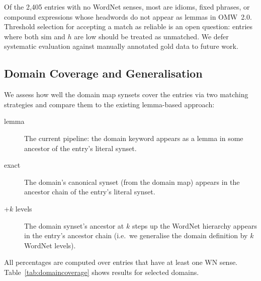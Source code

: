 \documentclass[11pt,a4paper]{article}
\begin{document}
Of the 2,405 entries with no WordNet senses, most are idioms, fixed
phrases, or compound expressions whose headwords do not appear as lemmas
in OMW~2.0.
Threshold selection for accepting a match as reliable is an open
question: entries where both $\mathrm{sim}$ and $h$ are low should be
treated as unmatched.
We defer systematic evaluation against manually annotated gold data to
future work.

\subsection{Domain Coverage and Generalisation}
\label{subsec:domaincoverage}

We assess how well the domain map synsets cover the entries via two
matching strategies and compare them to the existing lemma-based approach:

\begin{description}
  \item[lemma] The current pipeline: the domain keyword appears as a
    lemma in some ancestor of the entry's literal synset.
  \item[exact] The domain's canonical synset (from the domain map) appears
    in the ancestor chain of the entry's literal synset.
  \item[+$k$ levels] The domain synset's ancestor at $k$ steps up the
    WordNet hierarchy appears in the entry's ancestor chain (i.e.\ we
    generalise the domain definition by $k$ WordNet levels).
\end{description}

\noindent
All percentages are computed over entries that have at least one WN sense.
Table~\ref{tab:domaincoverage} shows results for selected domains.
\end{document}
